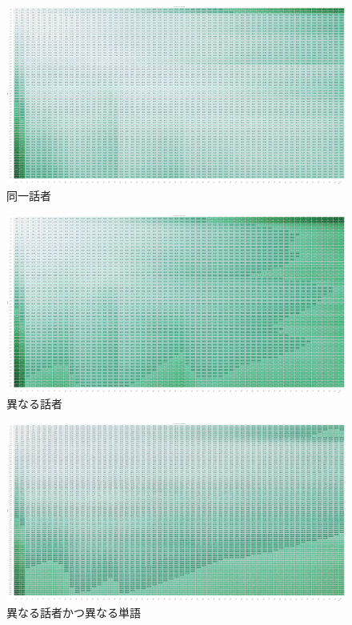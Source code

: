 \documentclass[a4paper,12pt]{article}
\begin{document}
\begin{figure}[h]
    \centering
    \includegraphics[bb=0.000000 0.000000 1329.122658 697.681395,width=1.0\hsize]{./same.png}
    \caption{同一話者}
    \label{fig:same}
\end{figure}

\begin{figure}[h]
    \centering
    \includegraphics[bb=0.000000 0.000000 1329.122658 697.681395,width=1.0\hsize]{./diffpeople.png}
    \caption{異なる話者}
    \label{fig:diffpeople}
\end{figure}

\begin{figure}[h]
    \centering
    \includegraphics[bb=0.000000 0.000000 1329.122658 697.681395,width=1.0\hsize]{./diffword.png}
    \caption{異なる話者かつ異なる単語}
    \label{fig:diffworde}
\end{figure}
\end{document}
